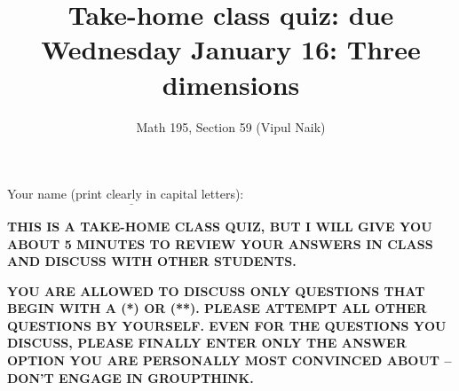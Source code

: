 \documentclass[10pt]{amsart}
\title{Take-home class quiz: due Wednesday January 16: Three dimensions}
\author{Math 195, Section 59 (Vipul Naik)}
\begin{document}
\maketitle

Your name (print clearly in capital letters): $\underline{\qquad\qquad\qquad\qquad\qquad\qquad\qquad\qquad\qquad\qquad}$

\vspace{0.1in}

{\bf THIS IS A TAKE-HOME CLASS QUIZ, BUT I WILL GIVE YOU ABOUT 5
  MINUTES TO REVIEW YOUR ANSWERS IN CLASS AND DISCUSS WITH OTHER
  STUDENTS.}

\vspace{0.1in}

{\bf YOU ARE ALLOWED TO DISCUSS ONLY QUESTIONS THAT BEGIN WITH A (*)
  OR (**). PLEASE ATTEMPT ALL OTHER QUESTIONS BY YOURSELF. EVEN FOR
  THE QUESTIONS YOU DISCUSS, PLEASE FINALLY ENTER ONLY THE ANSWER
  OPTION YOU ARE PERSONALLY MOST CONVINCED ABOUT -- DON'T ENGAGE IN
  GROUPTHINK.}
\end{document}
